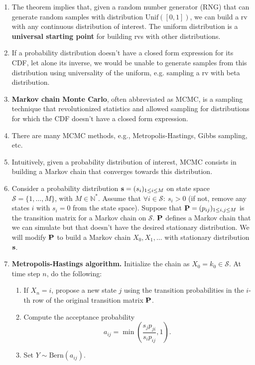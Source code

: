 \documentclass[twocolumn,12pt,a4paper]{article}
\newcommand{\N}{\mathbb N}
\newcommand{\bP}{\bold P}
\newcommand{\calS}{\mathcal S}
\newcommand{\bs}{\bold s}
\newcounter{num}  %
\begin{document}
\begin{enumerate}
	
	
	\item The theorem implies that, given a random number generator (RNG) that can generate random samples with distribution $\text{Unif}([0, 1])$, we can build a rv with any continuous distribution of interest. 
	The uniform distribution is a \textbf{universal starting point} for building rvs with other distributions. 
	
	\item If a probability distribution doesn't have a closed form expression for its CDF, let alone its inverse, we would be unable to generate samples from this distribution using universality of the uniform, e.g. sampling a rv with beta distribution.
	
	\item \textbf{Markov chain Monte Carlo}, often abbreviated as MCMC, is a sampling technique that revolutionized statistics and allowed sampling for distributions for which the CDF doesn't have a closed form expression.
	
	\item There are many MCMC methods, e.g., Metropolis-Hastings, Gibbs sampling, etc.
	
	\item Intuitively, given a probability distribution of interest, MCMC consists in building a Markov chain that converges towards this distribution.
	
	\item Consider a probability distribution \( \bs = (s_i)_{1\leq i\leq M} \) on state space \( \calS = \{1, \ldots, M\} \), with $M\in\N^*$. 
	Assume that \( \forall i \in \calS:\ s_i > 0 \) (if not, remove any states \( i \) with \( s_i = 0 \) from the state space). Suppose that \( \bP = (p_{ij})_{1\leq i,j\leq M} \) is the transition matrix for a Markov chain on $\calS$.  \( \bP \) defines a Markov chain that we can simulate but that doesn't have the desired stationary distribution.
	We will modify \( \bP \) to build a Markov chain \( X_0, X_1, \ldots \) with stationary distribution \( \bs \). 
	
	\item \textbf{Metropolis-Hastings algorithm.}
	Initialize the chain as \( X_0 = k_0 \in\calS\).
	At time step $n$, do the following:
	\begin{enumerate}
		\item If \( X_n = i \), propose a new state \( j \) using the transition probabilities in the \( i \)-th row of the original transition matrix \( \bP \).
		\item Compute the acceptance probability
		\[
		a_{ij} = \min\left( \frac{s_j p_{ji}}{s_i p_{ij}}, 1 \right).
		\]
		\item Set \(Y\sim\text{Bern}(a_{ij}) \).
		

\end{enumerate}
\end{enumerate}
\end{document}
